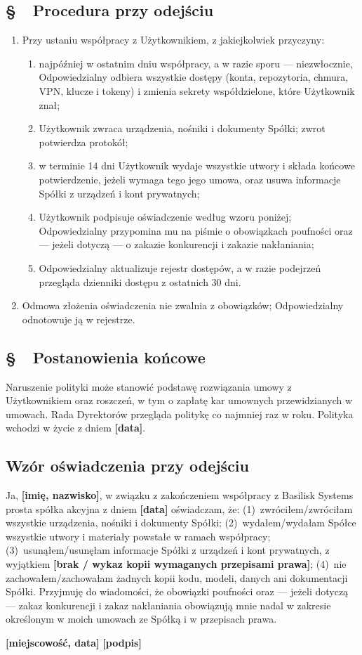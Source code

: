 \documentclass[11pt,a4paper]{report}
\newcounter{paragraf}
\newcommand{\paragraf}[1]{%
  \refstepcounter{paragraf}%
  \Needspace{5\baselineskip}%
  \subsection*{\S~\theparagraf\ #1}%
}
\newenvironment{ContractClause}[1]{\paragraf{#1}}{\par}
\newcommand{\field}[1]{\textbf{[#1]}}
\newcommand{\CompanyFull}{Basilisk Systems prosta spółka akcyjna}
\begin{document}
\begin{ContractClause}{Procedura przy odejściu}
\begin{enumerate}
  \item Przy ustaniu współpracy z Użytkownikiem, z jakiejkolwiek przyczyny:
  \begin{enumerate}[label=\alph*)]
    \item najpóźniej w ostatnim dniu współpracy, a w razie sporu --- niezwłocznie, Odpowiedzialny odbiera wszystkie dostępy (konta, repozytoria, chmura, VPN, klucze i tokeny) i zmienia sekrety współdzielone, które Użytkownik znał;
    \item Użytkownik zwraca urządzenia, nośniki i dokumenty Spółki; zwrot potwierdza protokół;
    \item w terminie 14 dni Użytkownik wydaje wszystkie utwory i składa końcowe potwierdzenie, jeżeli wymaga tego jego umowa, oraz usuwa informacje Spółki z urządzeń i kont prywatnych;
    \item Użytkownik podpisuje oświadczenie według wzoru poniżej; Odpowiedzialny przypomina mu na piśmie o obowiązkach poufności oraz --- jeżeli dotyczą --- o zakazie konkurencji i zakazie nakłaniania;
    \item Odpowiedzialny aktualizuje rejestr dostępów, a w razie podejrzeń przegląda dzienniki dostępu z ostatnich 30 dni.
  \end{enumerate}
  \item Odmowa złożenia oświadczenia nie zwalnia z obowiązków; Odpowiedzialny odnotowuje ją w rejestrze.
\end{enumerate}
\end{ContractClause}

\begin{ContractClause}{Postanowienia końcowe}
Naruszenie polityki może stanowić podstawę rozwiązania umowy z Użytkownikiem oraz roszczeń, w tym o zapłatę kar umownych przewidzianych w umowach. Rada Dyrektorów przegląda politykę co najmniej raz w roku. Polityka wchodzi w życie z dniem \field{data}.
\end{ContractClause}

\subsection*{Wzór oświadczenia przy odejściu}

Ja, \field{imię, nazwisko}, w związku z zakończeniem współpracy z \CompanyFull{} z dniem \field{data} oświadczam, że: (1)~zwróciłem/zwróciłam wszystkie urządzenia, nośniki i dokumenty Spółki; (2)~wydałem/wydałam Spółce wszystkie utwory i materiały powstałe w ramach współpracy; (3)~usunąłem/usunęłam informacje Spółki z urządzeń i kont prywatnych, z wyjątkiem \field{brak / wykaz kopii wymaganych przepisami prawa}; (4)~nie zachowałem/zachowałam żadnych kopii kodu, modeli, danych ani dokumentacji Spółki. Przyjmuję do wiadomości, że obowiązki poufności oraz --- jeżeli dotyczą --- zakaz konkurencji i zakaz nakłaniania obowiązują mnie nadal w zakresie określonym w moich umowach ze Spółką i w przepisach prawa.

\field{miejscowość, data} \hfill \field{podpis}
\end{document}
